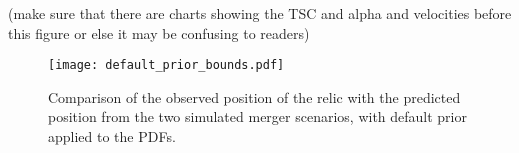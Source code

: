 \label{app: results}

(make sure that there are charts showing the TSC and alpha and velocities
before this figure or else it may be confusing to readers) 
\begin{figure}
	\texttt{[image: default\_prior\_bounds.pdf]}
	\caption{Comparison of the observed position of the relic with the
	predicted position from the two simulated merger scenarios, with
	default prior applied to the PDFs.
	\label{fig: polarprior_bounds}}
\end{figure}



